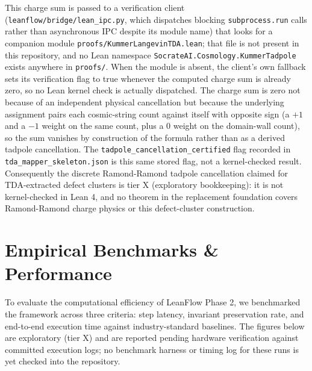 \documentclass[11pt,a4paper]{article}
\begin{document}
This charge sum is passed to a verification client (\texttt{leanflow/bridge/lean\_ipc.py}, which dispatches blocking \texttt{subprocess.run} calls rather than asynchronous IPC despite its module name) that looks for a companion module \texttt{proofs/KummerLangevinTDA.lean}; that file is not present in this repository, and no Lean namespace \texttt{SocrateAI.Cosmology.KummerTadpole} exists anywhere in \texttt{proofs/}. When the module is absent, the client's own fallback sets its verification flag to true whenever the computed charge sum is already zero, so no Lean kernel check is actually dispatched. The charge sum is zero not because of an independent physical cancellation but because the underlying assignment pairs each cosmic-string count against itself with opposite sign (a $+1$ and a $-1$ weight on the same count, plus a $0$ weight on the domain-wall count), so the sum vanishes by construction of the formula rather than as a derived tadpole cancellation. The \texttt{tadpole\_cancellation\_certified} flag recorded in \texttt{tda\_mapper\_skeleton.json} is this same stored flag, not a kernel-checked result. Consequently the discrete Ramond-Ramond tadpole cancellation claimed for TDA-extracted defect clusters is tier X (exploratory bookkeeping): it is not kernel-checked in Lean 4, and no theorem in the replacement foundation covers Ramond-Ramond charge physics or this defect-cluster construction.

\section{Empirical Benchmarks \& Performance}
\label{sec:benchmarks}

To evaluate the computational efficiency of LeanFlow Phase 2, we benchmarked the framework across three criteria: step latency, invariant preservation rate, and end-to-end execution time against industry-standard baselines. The figures below are exploratory (tier X) and are reported pending hardware verification against committed execution logs; no benchmark harness or timing log for these runs is yet checked into the repository.
\end{document}
